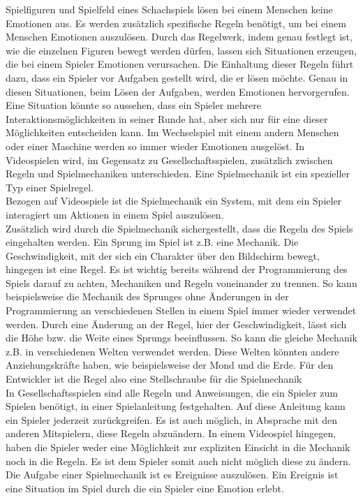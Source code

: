 Spielfiguren und Spielfeld eines Schachspiels lösen bei einem Menschen keine Emotionen aus. Es werden zusätzlich spezifische Regeln benötigt, um bei einem Menschen Emotionen auszulösen. Durch das Regelwerk, indem genau festlegt ist, wie die einzelnen Figuren bewegt werden dürfen, lassen sich Situationen erzeugen, die bei einem Spieler Emotionen verursachen. Die Einhaltung dieser Regeln führt dazu, dass ein Spieler vor Aufgaben gestellt wird, die er lösen möchte. Genau in diesen Situationen, beim Lösen der Aufgaben, werden Emotionen hervorgerufen. Eine Situation könnte so aussehen, dass ein Spieler mehrere Interaktionsmöglichkeiten in seiner Runde hat, aber sich nur für eine dieser Möglichkeiten entscheiden kann. Im Wechselspiel mit einem andern Menschen oder einer Maschine werden so immer wieder Emotionen ausgelöst. In Videospielen wird, im Gegensatz zu Gesellschaftsspielen, zusätzlich zwischen Regeln und Spielmechaniken unterschieden. Eine Spielmechanik ist ein spezieller Typ einer Spielregel. \cite[S. 4 ff.]{Adams:1515529} \\%
Bezogen auf Videospiele ist die Spielmechanik ein System, mit dem ein Spieler interagiert um Aktionen in einem Spiel auszulösen. \cite[S. 783]{Mattfeld:2012up} \\
Zusätzlich wird durch die Spielmechanik sichergestellt, dass die Regeln des Spiels eingehalten werden. Ein Sprung im Spiel ist z.B. eine Mechanik. Die Geschwindigkeit, mit der sich ein Charakter über den Bildschirm bewegt, hingegen ist eine Regel. Es ist wichtig bereits während der Programmierung des Spiels darauf zu achten, Mechaniken und Regeln voneinander zu trennen. So kann beispielsweise die Mechanik des Sprunges ohne Änderungen in der Programmierung an verschiedenen Stellen in einem Spiel immer wieder verwendet werden. Durch eine Änderung an der Regel, hier der Geschwindigkeit, lässt sich die Höhe bzw. die Weite eines Sprungs beeinflussen. So kann die gleiche Mechanik z.B. in verschiedenen Welten verwendet werden. Diese Welten könnten andere Anziehungskräfte haben, wie beispielsweise der Mond und die Erde. Für den Entwickler ist die Regel also eine Stellschraube für die Spielmechanik\\
In Gesellschaftsspielen sind alle Regeln und Anweisungen, die ein Spieler zum Spielen benötigt, in einer Spielanleitung festgehalten. Auf diese Anleitung kann ein Spieler jederzeit zurückgreifen. Es ist auch möglich, in Absprache mit den anderen Mitspielern, diese Regeln abzuändern. In einem Videospiel hingegen, haben die Spieler weder eine Möglichkeit zur expliziten Einsicht in die Mechanik noch in die Regeln. Es ist dem Spieler somit auch nicht möglich diese zu ändern. Die Aufgabe einer Spielmechanik ist es Ereignisse auszulösen. Ein Ereignis ist eine Situation im Spiel durch die ein Spieler eine Emotion erlebt. \cite[S. 7]{Adams:1515529}
